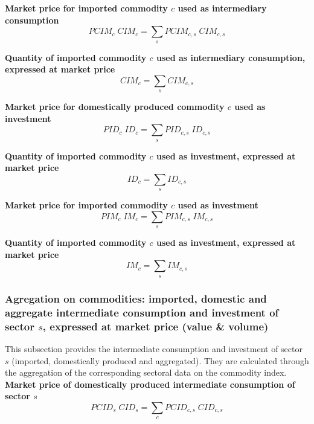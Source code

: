 \documentclass[12pt]{article}
\numberwithin{equation}{section}
\begin{document}
\noindent \textbf{Market price for imported commodity $c$ used as intermediary consumption} 
\begin{dmath}
PCIM_{c} \; CIM_{c} = \sum_{s} PCIM_{c, s} \; CIM_{c, s}
\label{SU.mdlPCIM[c]}
\end{dmath}

\noindent \textbf{Quantity of imported commodity $c$ used as intermediary consumption, expressed at market price} 
\begin{dmath}
CIM_{c} = \sum_{s} CIM_{c, s}
\label{SU.mdlCIM[c]}
\end{dmath}

\noindent \textbf{Market price for domestically produced commodity $c$ used as investment} 
\begin{dmath}
PID_{c} \; ID_{c} = \sum_{s} PID_{c, s} \; ID_{c, s}
\label{SU.mdlPID[c]}
\end{dmath}

\noindent \textbf{Quantity of imported commodity $c$ used as investment, expressed at market price} 
\begin{dmath}
ID_{c} = \sum_{s} ID_{c, s}
\label{SU.mdlID[c]}
\end{dmath}

\noindent \textbf{Market price for imported commodity $c$ used as investment} 
\begin{dmath}
PIM_{c} \; IM_{c} = \sum_{s} PIM_{c, s} \; IM_{c, s}
\label{SU.mdlPIM[c]}
\end{dmath}

\noindent \textbf{Quantity of imported commodity $c$ used as investment, expressed at market price} 
\begin{dmath}
IM_{c} = \sum_{s} IM_{c, s}
\label{SU.mdlIM[c]}
\end{dmath}




\subsubsection{Agregation on commodities: imported, domestic and aggregate intermediate consumption and investment of sector $s$, expressed at market price (value \& volume)}


This subsection provides the intermediate consumption and investment of sector $s$ (imported, domestically produced and aggregated). They are calculated through the aggregation of the corresponding sectoral data on the commodity index. \\

\noindent \textbf{Market price of domestically produced intermediate consumption of sector $s$} 
\begin{dmath}
PCID_{s} \; CID_{s} = \sum_{c} PCID_{c, s} \; CID_{c, s}
\label{SU.mdlPCID[s]}
\end{dmath}
\end{document}
